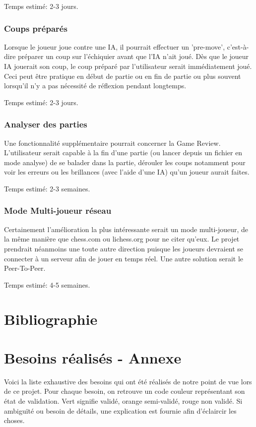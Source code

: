 \documentclass{article}
\begin{document}
Temps estimé: 2-3 jours.

\subsubsection{Coups préparés}
Lorsque le joueur joue contre une IA, il pourrait effectuer un 'pre-move', c'est-à-dire préparer un coup sur l'échiquier avant que l'IA n'ait joué. Dès que
le joueur IA jouerait son coup, le coup préparé par l'utilisateur serait immédiatement joué. Ceci peut être pratique en début de partie ou en fin de partie
ou plus souvent lorsqu'il n'y a pas nécessité de réflexion pendant longtemps.

Temps estimé: 2-3 jours.

\subsubsection{Analyser des parties}
Une fonctionnalité supplémentaire pourrait concerner la Game Review. L'utilisateur serait capable à la fin d'une partie (ou lancer depuis un fichier en mode
analyse) de se balader dans la partie, dérouler les coups notamment pour voir les erreurs ou les brillances (avec l'aide d'une IA) qu'un joueur aurait faites.

Temps estimé: 2-3 semaines.

\subsubsection{Mode Multi-joueur réseau}
Certainement l'amélioration la plus intéressante serait un mode multi-joueur, de la même manière que chess.com ou lichess.org pour ne citer qu'eux.
Le projet prendrait néanmoins une toute autre direction puisque les joueurs devraient se connecter à un serveur afin de jouer en temps réel. Une
autre solution serait le Peer-To-Peer.

Temps estimé: 4-5 semaines.

\pagebreak
\section{Bibliographie}
 
 

\pagebreak
\section{Besoins réalisés - Annexe}
\label{Spec}

Voici la liste exhaustive des besoins qui ont été réalisés de notre point de vue lors de ce projet. Pour chaque besoin, on retrouve un code couleur représentant
son état de validation. Vert signifie validé, orange semi-validé, rouge non validé. Si ambiguïté ou besoin de détails, une explication
est fournie afin d'éclaircir les choses.
\end{document}
